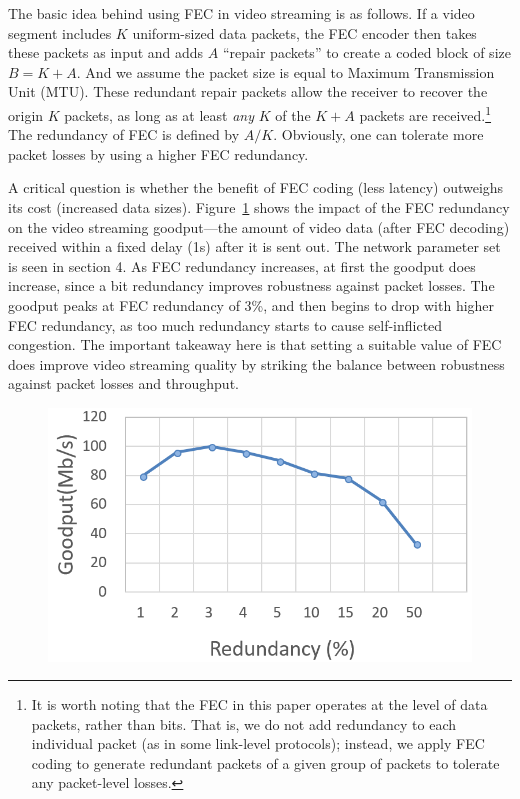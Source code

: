 The basic idea behind using FEC in video streaming is as follows. 
If a video segment includes $K$ uniform-sized data packets, the FEC 
encoder then takes these packets as input and adds $A$ ``repair 
packets'' to create a coded block of size ${{B = K + A}}$. And we assume the packet size is equal to Maximum Transmission Unit (MTU). These redundant repair packets allow the receiver to recover the origin $K$ packets, as long as at least {\em any} $K$ of the ${K + A}$ 
packets are received.\footnote{It is worth noting that the FEC in 
this paper operates at the level of data packets, rather than bits.
That is, we do not add redundancy to each individual packet (as in 
some link-level protocols); instead, we apply FEC coding to 
generate redundant packets of a given group of packets to tolerate
any packet-level losses.} The redundancy of FEC is defined by 
${A/K}$. Obviously, one can tolerate more packet losses by using a 
higher FEC redundancy. 
	
A critical question is whether the benefit of FEC coding (\ie less
latency) outweighs its cost (\ie increased data sizes).
Figure~\ref{fig:goodput_redundancy} shows the impact of the FEC redundancy on the video
streaming goodput---the amount of video data (after FEC decoding) 
received within a fixed delay (1s) after it is sent out. The network parameter set is seen in section 4.
As FEC redundancy increases, at first the goodput 
does increase, since a bit redundancy improves robustness against 
packet losses. The goodput peaks at FEC redundancy of 3\%,  and then begins to
drop with higher FEC redundancy, 
as too much redundancy starts to cause self-inflicted congestion.
The important takeaway here is that setting a suitable value of FEC 
does improve video streaming quality by striking the balance between
robustness against packet losses and throughput. 

\begin{figure}[t]
	\centering
	\includegraphics[scale=0.32]{paper_figs/goodput_With_redundany_big_font.png}
	\label{fig:goodput_redundancy}
\end{figure}


